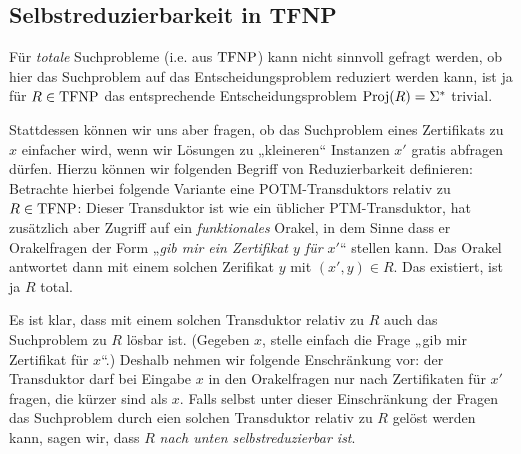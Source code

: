 \subsection*{Selbstreduzierbarkeit in TFNP}

Für \emph{totale} Suchprobleme (i.e. aus $\mathrm{TFNP}$) kann nicht sinnvoll gefragt werden, ob hier das Suchproblem auf das Entscheidungsproblem reduziert werden kann, ist ja für $R\in\mathrm{TFNP}$ das entsprechende Entscheidungsproblem $\operatorname{Proj}(R)=\Sigma^*$ trivial.

Stattdessen können wir uns aber fragen, ob das Suchproblem eines Zertifikats zu $x$ einfacher wird, wenn wir Lösungen zu „kleineren“ Instanzen $x'$ gratis abfragen dürfen.
Hierzu können wir folgenden Begriff von Reduzierbarkeit definieren:
Betrachte hierbei folgende Variante eine POTM-Transduktors relativ zu $R\in\mathrm{TFNP}$: Dieser Transduktor ist wie ein üblicher PTM-Transduktor, hat zusätzlich aber Zugriff auf ein \emph{funktionales} Orakel, in dem Sinne dass er Orakelfragen der Form „\emph{gib mir ein Zertifikat $y$ für $x'$}“ stellen kann. Das Orakel antwortet dann mit einem solchen Zerifikat $y$ mit $(x', y)\in R$. Das existiert, ist ja $R$ total. 

Es ist klar, dass mit einem solchen Transduktor relativ zu $R$ auch das Suchproblem zu $R$ lösbar ist. (Gegeben $x$, stelle einfach die Frage „gib mir Zertifikat für $x$“.) Deshalb nehmen wir folgende Enschränkung vor: der Transduktor darf bei Eingabe $x$ in den Orakelfragen nur nach Zertifikaten für $x'$ fragen, die kürzer sind als $x$.
Falls selbst unter dieser Einschränkung der Fragen das Suchproblem durch eien solchen Transduktor relativ zu $R$ gelöst werden kann, sagen wir, dass $R$ \emph{nach unten selbstreduzierbar ist}.

